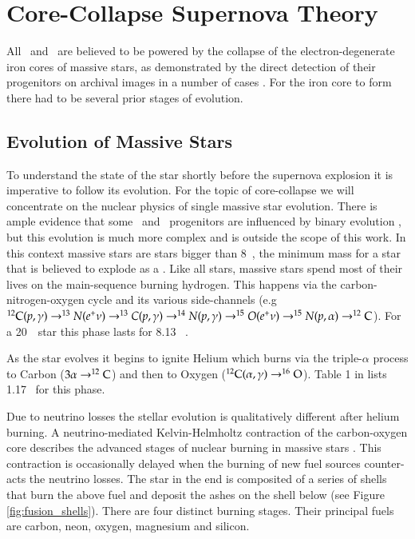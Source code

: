 \newpage
\section{Core-Collapse Supernova Theory}

All \sneii\ and \sneibc\ are believed to be powered by the collapse of the electron-degenerate iron cores of massive stars, as demonstrated by the direct detection of their progenitors on archival images in a number of cases \citep[for a review see][]{2009ARA&A..47...63S}. For the iron core to form there had to be several prior stages of evolution.

\subsection{Evolution of Massive Stars}

To understand the state of the star shortly before the supernova explosion it is imperative to follow its evolution. For the topic of core-collapse we will concentrate on the nuclear physics of single massive star evolution. There is ample evidence that some \sneii\ and \sneibc\ progenitors are influenced by binary evolution \citep{1992ApJ...391..246P}, but this evolution is much more complex and is outside the scope of this work.  In this context massive stars are stars bigger than 8~\msun, the minimum mass for a star that is believed to explode as a \snii. Like all stars, massive stars spend most of their lives on the main-sequence burning hydrogen. This happens via the carbon-nitrogen-oxygen cycle and its various side-channels (e.g $\nucl{C}{12}(p,\gamma)\rightarrow^{13}N(e^+\nu)\rightarrow^{13}C(p,\gamma)\rightarrow^{14}N(p,\gamma)\rightarrow^{15}O(e^+\nu)\rightarrow^{15}N(p,\alpha)\rightarrow\nucl{C}{12}$). For a 20~\msun\ star this phase lasts for 8.13 \myr\ \citep[see][]{2002RvMP...74.1015W}.

As the star evolves it begins to ignite Helium which burns via the triple-$\alpha$ process to Carbon ($3\alpha\rightarrow\Carb$) and then to Oxygen ($\nucl{C}{12}(\alpha,\gamma)\rightarrow\Ox$). Table 1 in \citet{2002RvMP...74.1015W} lists 1.17 \myr\ for this phase. 

Due to neutrino losses the stellar evolution is qualitatively different after helium burning. A neutrino-mediated Kelvin-Helmholtz contraction of the carbon-oxygen core describes the advanced stages of nuclear burning in massive stars \citep{2002RvMP...74.1015W}. This contraction is occasionally delayed when the burning of new fuel sources counter-acts the neutrino losses. The star in the end is composited of a series of shells that burn the above fuel and deposit the ashes on the shell below (see Figure \ref{fig:fusion_shells}). There are four distinct burning stages. Their principal fuels are carbon, neon, oxygen, magnesium and silicon.

